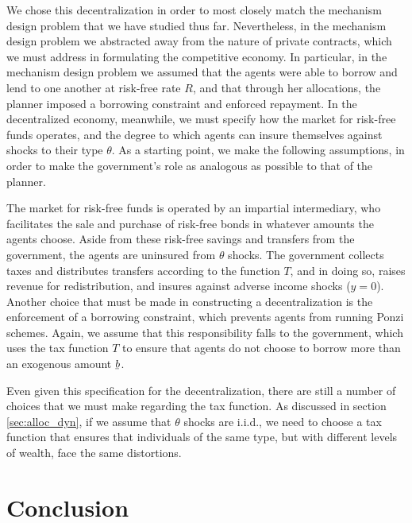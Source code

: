 \documentclass[11pt]{article}
\newcommand{\ubar}[1]{\underaccent{\bar}{#1}}
\begin{document}
We chose this decentralization in order to most closely match the mechanism design problem that we have studied thus far. Nevertheless, in the mechanism design problem we abstracted away from the nature of private contracts, which we must address in formulating the competitive economy. In particular, in the mechanism design problem we assumed that the agents were able to borrow and lend to one another at risk-free rate \( R \), and that through her allocations, the planner imposed a borrowing constraint and enforced repayment. In the decentralized economy, meanwhile, we must specify how the market for risk-free funds operates, and the degree to which agents can insure themselves against shocks to their type \( \theta \). As a starting point, we make the following assumptions, in order to make the government's role as analogous as possible to that of the planner. 

The market for risk-free funds is operated by an impartial intermediary, who facilitates the sale and purchase of risk-free bonds in whatever amounts the agents choose. Aside from these risk-free savings and transfers from the government, the agents are uninsured from \( \theta \) shocks. The government collects taxes and distributes transfers according to the function \( T \), and in doing so, raises revenue for redistribution, and insures against adverse income shocks (\( y=0 \)). Another choice that must be made in constructing a decentralization is the enforcement of a borrowing constraint, which prevents agents from running Ponzi schemes. Again, we assume that this responsibility falls to the government, which uses the tax function \( T \) to ensure that agents do not choose to borrow more than an exogenous amount \( \ubar{b} \). 

Even given this specification for the decentralization, there are still a number of choices that we must make regarding the tax function. As discussed in section \ref{sec:alloc_dyn}, if we assume that \( \theta \) shocks are i.i.d., we need to choose a tax function that ensures that individuals of the same type, but with different levels of wealth, face the same distortions.

\section{Conclusion} \label{sec:conc}
\end{document}
